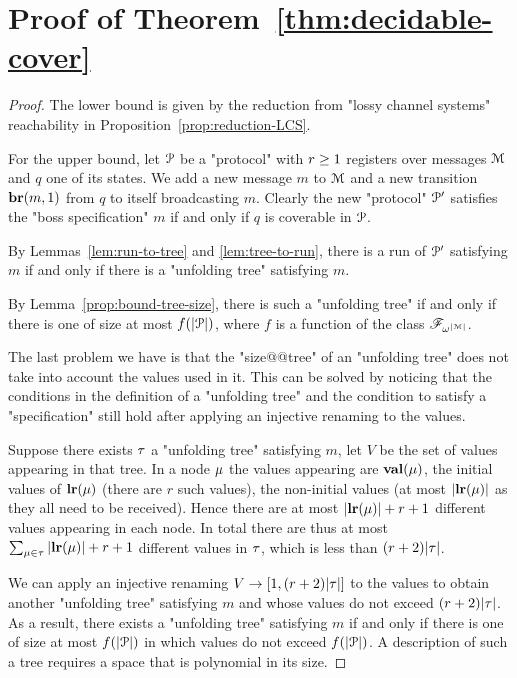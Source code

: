 \section{Proof of Theorem~\ref{thm:decidable-cover}}
\label{app:decidability}


\decidablecover*

\begin{proof}
	The lower bound is given by the reduction from "lossy channel systems" reachability in Proposition~\ref{prop:reduction-LCS}.
	
	For the upper bound, let $\mathcal{P}$ be a "protocol" with $r \geq 1$ registers over messages $\mathcal{M}$ and $q$ one of its states. We add a new message $m$ to $\mathcal{M}$ and a new transition $\textbf{br}(m, 1)$ from $q$ to itself broadcasting $m$. 
	Clearly the new "protocol" $\mathcal{P}'$ satisfies the "boss specification" $m$ if and only if $q$ is coverable in $\mathcal{P}$.
	
	By Lemmas~\ref{lem:run-to-tree} and \ref{lem:tree-to-run}, there is a run of $\mathcal{P}'$ satisfying $m$ if and only if there is a "unfolding tree" satisfying $m$.

	By Lemma~\ref{prop:bound-tree-size}, there is such a "unfolding tree" if and only if there is one of size at most $f(|\mathcal{P}|)$, where $f$ is a function of the class $\mathscr{F}_{\omega^{|\mathcal{M}|}}$.
	
	The last problem we have is that the "size@@tree" of an "unfolding tree" does not take into account the values used in it. This can be solved by noticing that the conditions in the definition of a "unfolding tree" and the condition to satisfy a "specification" still hold after applying an injective renaming to the values. 
	
	Suppose there exists $\tau$ a "unfolding tree" satisfying $m$, let $V$ be the set of values appearing in that tree. In a node $\mu$ the values appearing are $\mathbf{val}(\mu)$, the initial values of $\mathbf{lr}(\mu)$ (there are $r$ such values), the non-initial values (at most $|\mathbf{lr}(\mu)|$ as they all need to be received).
	Hence there are at most $|\mathbf{lr}(\mu)| + r +1$ different values appearing in each node.
	In total there are thus at most $\sum_{\mu \in \tau} |\mathbf{lr}(\mu)| + r +1$ different values in $\tau$, which is less than $(r+2)|\tau|$.
	
	We can apply an injective renaming $V \to [1,(r+2)|\tau|]$ to the values to obtain another "unfolding tree" satisfying $m$ and whose values do not exceed $(r+2)|\tau|$.
	As a result, there exists a "unfolding tree" satisfying $m$ if and only if there is one of size at most $f(|\mathcal{P}|)$ in which values do not exceed $f(|\mathcal{P}|)$. A description of such a tree requires a space that is polynomial in its size.
	

\end{proof}

